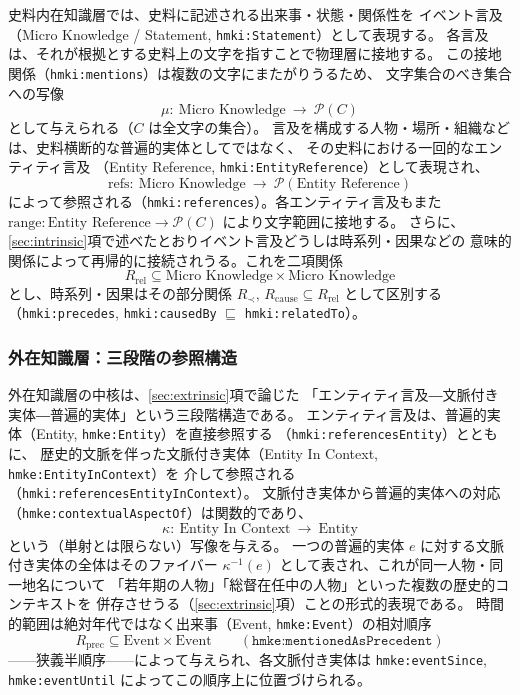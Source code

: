 史料内在知識層では、史料に記述される出来事・状態・関係性を
イベント言及（Micro Knowledge / Statement, \texttt{hmki:Statement}）として表現する。
各言及は、それが根拠とする史料上の文字を指すことで物理層に接地する。
この接地関係（\texttt{hmki:mentions}）は複数の文字にまたがりうるため、
文字集合のべき集合への写像
\[
  \mu:\ \text{Micro Knowledge} \ \longrightarrow\ \mathcal{P}(C)
\]
として与えられる（$C$ は全文字の集合）。
言及を構成する人物・場所・組織などは、史料横断的な普遍的実体としてではなく、
その史料における一回的なエンティティ言及
（Entity Reference, \texttt{hmki:EntityReference}）として表現され、
\[
  \mathrm{refs}:\ \text{Micro Knowledge} \ \longrightarrow\ \mathcal{P}(\text{Entity Reference})
\]
によって参照される（\texttt{hmki:references}）。各エンティティ言及もまた
$\mathrm{range} : \text{Entity Reference} \to \mathcal{P}(C)$ により文字範囲に接地する。
さらに、\ref{sec:intrinsic}項で述べたとおりイベント言及どうしは時系列・因果などの
意味的関係によって再帰的に接続されうる。これを二項関係
\[
  R_{\mathrm{rel}} \subseteq \text{Micro Knowledge} \times \text{Micro Knowledge}
\]
とし、時系列・因果はその部分関係 $R_{\prec},\,R_{\mathrm{cause}} \subseteq R_{\mathrm{rel}}$
として区別する（\texttt{hmki:precedes}, \texttt{hmki:causedBy}
$\sqsubseteq$ \texttt{hmki:relatedTo}）。

\subsubsection*{外在知識層：三段階の参照構造}

外在知識層の中核は、\ref{sec:extrinsic}項で論じた
「エンティティ言及―文脈付き実体―普遍的実体」という三段階構造である。
エンティティ言及は、普遍的実体（Entity, \texttt{hmke:Entity}）を直接参照する
（\texttt{hmki:referencesEntity}）とともに、
歴史的文脈を伴った文脈付き実体（Entity In Context, \texttt{hmke:EntityInContext}）を
介して参照される（\texttt{hmki:referencesEntityInContext}）。
文脈付き実体から普遍的実体への対応（\texttt{hmke:contextualAspectOf}）は関数的であり、
\[
  \kappa:\ \text{Entity In Context} \ \longrightarrow\ \text{Entity}
\]
という（単射とは限らない）写像を与える。
一つの普遍的実体 $e$ に対する文脈付き実体の全体はそのファイバー
$\kappa^{-1}(e)$ として表され、これが同一人物・同一地名について
「若年期の人物」「総督在任中の人物」といった複数の歴史的コンテキストを
併存させうる（\ref{sec:extrinsic}項）ことの形式的表現である。
時間的範囲は絶対年代ではなく出来事（Event, \texttt{hmke:Event}）の相対順序
\[
  R_{\mathrm{prec}} \subseteq \text{Event} \times \text{Event}
  \qquad (\texttt{hmke:mentionedAsPrecedent})
\]
——狭義半順序——によって与えられ、各文脈付き実体は
\texttt{hmke:eventSince}, \texttt{hmke:eventUntil} によってこの順序上に位置づけられる。

